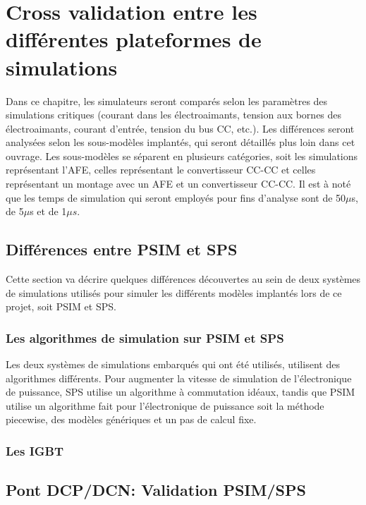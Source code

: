 \documentclass[11pt,letterpaper,final]{report}
\begin{document}
\chapter{Cross validation entre les différentes plateformes de simulations}
Dans ce chapitre, les simulateurs seront comparés selon les paramètres des simulations critiques (courant dans les électroaimants, tension aux bornes des électroaimants, courant d'entrée, tension du bus CC, etc.). Les différences seront analysées selon les sous-modèles implantés, qui seront détaillés plus loin dans cet ouvrage. Les sous-modèles se séparent en plusieurs catégories, soit les simulations représentant l'AFE, celles représentant le convertisseur CC-CC et celles représentant un montage avec un AFE et un convertisseur CC-CC. Il est à noté que les temps de simulation qui seront employés pour fins d'analyse sont de 50$\mu$s, de 5$\mu$s et de 1$\mu s$. 

\section{Différences entre PSIM et SPS}
Cette section va décrire quelques différences découvertes au sein de deux systèmes de simulations utilisés pour simuler les différents modèles implantés lors de ce projet, soit PSIM et SPS.

\subsection{Les algorithmes de simulation sur PSIM et SPS}
Les deux systèmes de simulations embarqués qui ont été utilisés, utilisent des algorithmes différents. Pour augmenter la vitesse de simulation de l'électronique de puissance, SPS utilise un algorithme à commutation idéaux, tandis que PSIM utilise un algorithme fait pour l'électronique de puissance soit la méthode piecewise, des modèles génériques et un pas de calcul fixe.

\subsection{Les IGBT}




 




\section{Pont DCP/DCN: Validation PSIM/SPS}
\end{document}
